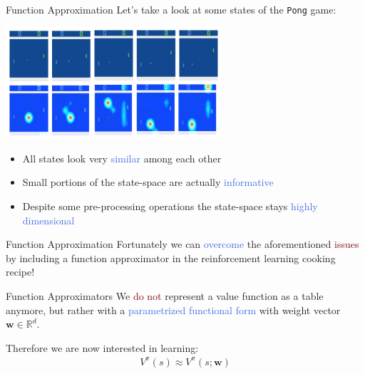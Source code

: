 \documentclass{beamer}
\begin{document}
\begin{frame}{Function Approximation}
	Let's take a look at some states of the \texttt{Pong} game:
	\begin{center}
		\includegraphics[width=8cm]{./Images/pong}
	\end{center}


	\begin{itemize}
		\item All states look very \textcolor{RoyalBlue}{similar} among each other
		\item Small portions of the state-space are actually \textcolor{RoyalBlue}{informative}
		\item Despite some pre-processing operations the state-space stays \textcolor{RoyalBlue}{highly dimensional}
	\end{itemize}

\end{frame}


\begin{frame}{Function Approximation}
	Fortunately we can \textcolor{RoyalBlue}{overcome} the aforementioned \textcolor{Maroon}{issues} by including a function approximator in the reinforcement learning cooking recipe!
	\begin{block}{Function Approximators}
		We \textcolor{Maroon}{do not} represent a value function as a table anymore, but rather with a \textcolor{RoyalBlue}{parametrized functional form} with weight vector $\mathbf{w}\in\mathds{R}^{d}$.


		Therefore we are now interested in learning:
		\begin{align*}
			V^{\pi}(s) \approx V^{\pi}(s;\mathbf{w})
		\end{align*}
	\end{block}

\end{frame}
\end{document}
